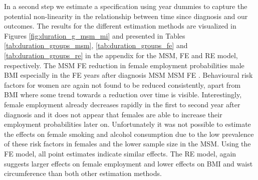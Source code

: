 In a second step we estimate a specification using year dummies to capture the potential non-linearity in the relationship between time since diagnosis and our outcomes. The results for the different estimation methods are visualized in Figures \ref{fig:duration_g_msm_mi} \DIFdelbegin {}\DIFdelend \DIFaddbegin {}\DIFaddend and presented in Tables \ref{tab:duration_groups_msm}, \ref{tab:duration_groups_fe} and \ref{tab:duration_groups_re} in the appendix for the \ac{MSM}, \ac{FE} and \ac{RE} model, respectively.  The \ac{MSM} \DIFdelbegin {}\DIFdelend \DIFaddbegin {}\ac{FE} \DIFaddend reduction in female employment probabilities \DIFdelbegin {}\DIFdelend \DIFaddbegin {}\DIFaddend male \ac{BMI} \DIFdelbegin {}\DIFdelend \DIFaddbegin {}\DIFaddend especially in the \DIFdelbegin {}\DIFdelend \DIFaddbegin \ac{FE} \DIFaddend years after diagnosis \DIFaddbegin {}\ac{MSM} \ac{MSM} \ac{FE} \DIFaddend . Behavioural risk factors for women are again not found to be reduced consistently, apart from \ac{BMI} where some trend towards a reduction over time is visible. Interestingly, female employment already decreases rapidly in the first to second year after diagnosis and it does not appear that females are able to increase their employment probabilities later on. Unfortunately it was not possible to estimate the effects on female smoking and alcohol consumption due to the low prevalence of these risk factors in females and the lower sample size in the \ac{MSM}. Using the \ac{FE} model, all point estimates indicate similar effects. The \ac{RE} model, again suggests larger effects on female employment and lower effects on \ac{BMI} and waist circumference than both other estimation methods. 

